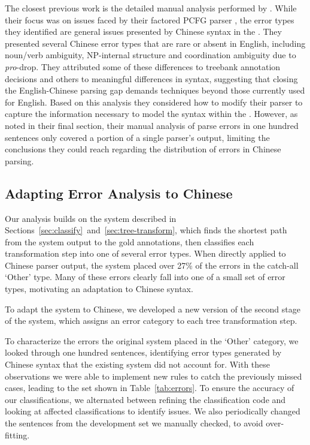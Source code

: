 The closest previous work is the detailed manual analysis performed by \textcite{Levy-Manning:2003:ACL}.
While their focus was on issues faced by their factored PCFG parser \parencite{Klein-Manning:2003:NIPS}, the error types they identified are general issues presented by Chinese syntax in the \pctb.
They presented several Chinese error types that are rare or absent in English, including noun/verb ambiguity, NP-internal structure and coordination ambiguity due to \emph{pro}-drop.
They attributed some of these differences to treebank annotation decisions and others to meaningful differences in syntax, suggesting that closing the English-Chinese parsing gap demands techniques beyond those currently used for English.
Based on this analysis they considered how to modify their parser to capture the information necessary to model the syntax within the \pctb.
However, as noted in their final section, their manual analysis of parse errors in one hundred sentences only covered a portion of a single parser's output, limiting the conclusions they could reach regarding the distribution of errors in Chinese parsing.

\subsection{Adapting Error Analysis to Chinese} \label{sec:adapting_automatic_error_analysis_to_chinese}

Our analysis builds on the system described in Sections~\ref{sec:classify}~and~\ref{sec:tree-transform}, which finds the shortest path from the system output to the gold annotations, then classifies each transformation step into one of several error types.
When directly applied to Chinese parser output, the system placed over 27\% of the errors in the catch-all `Other' type.
Many of these errors clearly fall into one of a small set of error types, motivating an adaptation to Chinese syntax.

To adapt the system to Chinese, we developed a new version of the second stage of the system, which assigns an error category to each tree transformation step.

To characterize the errors the original system placed in the `Other' category,
we looked through one hundred sentences, identifying error types generated by
Chinese syntax that the existing system did not account for.
With these observations we were able to implement new rules to catch the
previously missed cases, leading to the set shown in Table~\ref{tab:errors}.
To ensure the accuracy of our classifications, we alternated between refining
the classification code and looking at affected classifications to identify
issues.  We also periodically changed the sentences from the development set
we manually checked, to avoid over-fitting.

